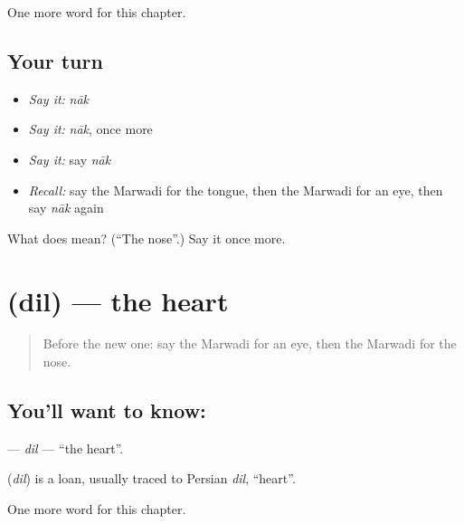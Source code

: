 \begin{grammarlens}[title={What you've built}]
One more word for this chapter.
\end{grammarlens}

\subsection*{Your turn}
\begin{itemize}
\raggedright
  \item \emph{Say it:} \emph{nāk}
  \item \emph{Say it:} \emph{nāk}, once more
  \item \emph{Say it:} say \emph{nāk}
  \item \emph{Recall:} say the Marwadi for the tongue, then the Marwadi for an eye, then say \emph{nāk} again
\end{itemize}

\begin{tcolorbox}[breakable,colback=teal!4,colframe=teal!35!black,title={Before you move on}]
What does  mean? (\textquotedblleft{}The nose\textquotedblright{}.) Say it once more.
\end{tcolorbox}
\section[\texorpdfstring{\mw{दिल} (dil)}{दिल (dil)}]{ (dil) — the heart}

\label{lesson:MW-C46-dil}



\begin{quote}
Before the new one: say the Marwadi for an eye, then the Marwadi for the nose.
\end{quote}

\subsection*{You'll want to know: }
\textbf{} — \emph{dil} — \textquotedblleft{}the heart\textquotedblright{}.

\begin{cousinweb}
\textbf{} (\emph{dil}) is a loan, usually traced to Persian \emph{dil}, \textquotedblleft{}heart\textquotedblright{}.
\end{cousinweb}

\begin{grammarlens}[title={What you've built}]
One more word for this chapter.
\end{grammarlens}

